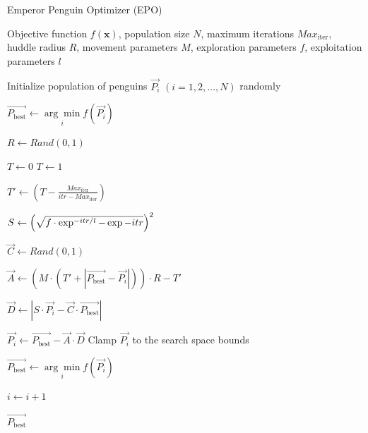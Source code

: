 \begin{algorithm}[H]
    \caption{Emperor Penguin Optimizer (EPO)}
    \label{alg:epo}
    \begin{algorithmic}[1]
    \Require Objective function $f(\mathbf{x})$, population size $N$, maximum iterations $Max_{\text{iter}}$, huddle radius $R$, movement parameters $M$, exploration parameters $f$, exploitation parameters $l$
    
    \State Initialize population of penguins $\vec{P_i}$ $(i = 1, 2, \dots, N)$ randomly

    \State $\vec{P_{\text{best}}} \gets \underset{i}{\arg\min} f(\vec{P_i})$ 
    
        \State $R \gets Rand(0, 1)$ 
        
            \State $T \gets 0$
        \Else
            \State $T \gets 1$
        \EndIf

        \State $T' \gets (T - \frac{Max_{\text{iter}}}{itr - Max_{\text{iter}}})$ 

        \State $S \gets \Bigl(\sqrt{f\cdot\exp^{-itr/l}-\exp{-itr}}\Bigr)^2$ 

            \State $\vec{C} \gets Rand(0, 1)$ 
            
            \State $\vec{A} \gets (M \cdot (T' + |\vec{P_{\text{best}}} - \vec{P_i}|)) \cdot R - T'$ 

            \State $\vec{D} \gets |S \cdot \vec{P_i} - \vec{C} \cdot \vec{P_{\text{best}}}|$ 

            \State $\vec{P_i} \gets \vec{P_{\text{best}}} - \vec{A} \cdot \vec{D}$ 
            \State Clamp $\vec{P_i}$ to the search space bounds
        \EndFor

         

            \State $\vec{P_{\text{best}}} \gets \underset{i}{\arg\min} f(\vec{P_i})$ 
        \EndIf

        \State $i \gets i + 1$
    \EndWhile
  
    \State \Return $\vec{P_{\text{best}}}$

    \end{algorithmic}
\end{algorithm}



